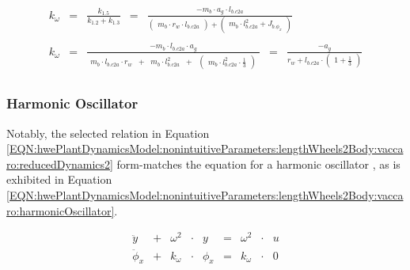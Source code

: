 \documentclass[crop=false,float=true,class=scrreprt]{standalone}
\begin{document}
\begin{gather}
\label{EQN:hwePlantDynamicsModel:nonintuitiveParameters:lengthWheels2Body:vaccaro:reducedDynamics2:kw1}
\begin{array}{ccccccccc}
k_{\omega}
& = &
\displaystyle\frac{k_{1.5}}{k_{1.2} + k_{1.3}}
& = &
\displaystyle\frac
{-m_{b} \cdot a_{g} \cdot l_{b.c2a}}
{
\begin{pmatrix} m_{b} \cdot r_{w} \cdot l_{b.c2a} \end{pmatrix}
+
\begin{pmatrix} m_{b} \cdot l_{b.c2a}^{2} + J_{b.\phi_{x}} \end{pmatrix}
}
\end{array}
\\[+3em]
\label{EQN:hwePlantDynamicsModel:nonintuitiveParameters:lengthWheels2Body:vaccaro:reducedDynamics2:kw2}
\begin{array}{ccccccccc}
k_{\omega}
& = &
\displaystyle\frac
{-m_{b} \cdot l_{b.c2a} \cdot a_{g}}
{
\begin{array}{cccccc}
m_{b} \cdot l_{b.c2a} \cdot r_{w}
& + &
m_{b} \cdot l_{b.c2a}^{2}
& + &
\begin{pmatrix} \displaystyle m_{b} \cdot l_{b.c2a}^{2} \cdot \frac{1}{3} \end{pmatrix}
\end{array}
}
& = &
\displaystyle\frac
{-a_{g} }
{
r_{w} + l_{b.c2a} \cdot 
\begin{pmatrix} \displaystyle 1 + \frac{1}{3} \end{pmatrix}
}
\end{array}
\end{gather}




\subsubsection*{Harmonic Oscillator}

Notably, the selected relation in Equation~%
\eqref{EQN:hwePlantDynamicsModel:nonintuitiveParameters:lengthWheels2Body:vaccaro:reducedDynamics2}
form-matches the equation for a harmonic oscillator
\cite[{\fns p. 119~-~120, 122~-~123}]{REF:textbook:1995-vaccaro},
as is exhibited in Equation~%
\eqref{EQN:hwePlantDynamicsModel:nonintuitiveParameters:lengthWheels2Body:vaccaro:harmonicOscillator}.


\vspace{-1em}

\begin{equation}
\label{EQN:hwePlantDynamicsModel:nonintuitiveParameters:lengthWheels2Body:vaccaro:harmonicOscillator}
\begin{array}{ccccccccc}
\ddot{y}
& + &
\omega^{2} 
& \cdot &
y
& = &
\omega^{2} 
& \cdot &
u
\\[+1em]
\ddot{\phi}_{x}
& + &
k_{\omega}
& \cdot &
\phi_{x}
& = &
k_{\omega}
& \cdot &
0
\end{array}
\end{equation}
\end{document}
